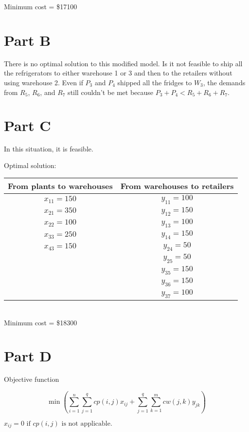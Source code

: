 \documentclass[11pt]{scrreprt}
\begin{document}
Minimum cost = \$17100

\section{Part B}
There is no optimal solution to this modified model. Is it not feasible to ship all the refrigerators to either warehouse 1 or 3 and then to the retailers without using warehouse 2. Even if $P_3$ and $P_4$ shipped all the fridges to $W_3$, the demands from $R_5$, $R_6$, and $R_7$ still couldn't be met because $P_3 + P_4 < R_5 + R_6 + R_7$.

\section{Part C}
In this situation, it is feasible.

Optimal solution:

\begin{tabular}{|c|c|}
	\hline From plants to warehouses & From warehouses to retailers \\
	\hline $x_{11} = 150$ & $y_{11} = 100$ \\
	\hline $x_{21} = 350$ & $y_{12} = 150$ \\
	\hline $x_{22} = 100$ & $y_{13} = 100$  \\
	\hline $x_{33} = 250$ & $y_{14} = 150$  \\
	\hline $x_{43} = 150$ & $y_{24} = 50$  \\
	\hline 				  & $y_{25} = 50$ \\
	\hline 				  & $y_{35} = 150$ \\
	\hline 				  & $y_{36} = 150$ \\
	\hline 				  & $y_{37} = 100$ \\
	\hline
\end{tabular} \\

Minimum cost = \$18300

\section{Part D}

Objective function

\begin{displaymath}
\min \left(\sum_{i=1}^{n} \sum_{j=1}^{q} cp(i,j)x_{ij} + \sum_{j=1}^{q} \sum_{k=1}^{m} cw(j,k)y_{jk}\right)
\end{displaymath}

$x_{ij}=0 \textrm{ if } cp(i,j) \textrm{ is not applicable. } $
\end{document}

